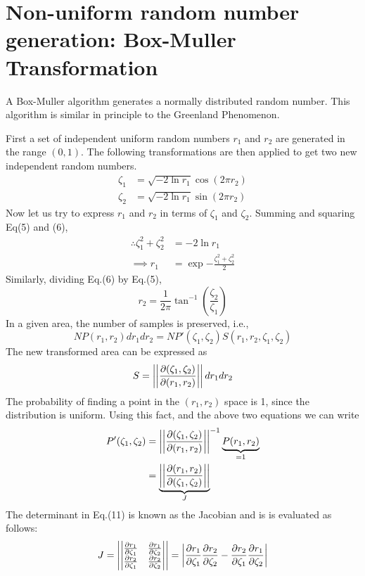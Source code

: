 \documentclass[12pt, oneside]{article}   	%
\begin{document}
\pagebreak


\pagebreak
\section{Non-uniform random number generation: Box-Muller Transformation}
A Box-Muller algorithm generates a normally distributed random number. This algorithm is similar in principle to the Greenland Phenomenon.

First a set of independent uniform random numbers $r_1$ and $r_2$ are generated in the range $(0,1)$.  The following transformations are then applied to get two new independent random numbers.
	\begin{align}
	\zeta_1 &= \sqrt{-2 \ln r_1} \cos{(2 \pi r_2)} \\
	\zeta_2 &= \sqrt{-2 \ln r_1} \sin{(2 \pi r_2)} 
	\end{align}
Now let us try to express $r_1$ and $r_2$ in terms of $\zeta_1$ and $\zeta_2$. Summing and squaring Eq(5) and (6),
	\begin{align}
	\therefore \zeta_1 ^2 + \zeta_2 ^2 &= -2 \ln{r_1} \\
	\implies r_1 &= \exp{-\frac{\zeta_1 ^2 + \zeta_2 ^2}{2}}
	\end{align}
Similarly, dividing Eq.(6) by Eq.(5),
	\begin{equation}
	r_2 = \frac{1}{2\pi} \tan^{-1}{\left( \frac{\zeta_2}{\zeta_1} \right) }
	\end{equation}
In a given area, the number of samples is preserved, i.e.,
	$$N P(r_1,r_2)dr_1 dr_2 = N  P'(\zeta_1, \zeta_2) S(r_1, r_2, \zeta_1,\zeta_2) $$
The new transformed area can be expressed as
	$$ S = \left| \left| \pdv{(\zeta_1, \zeta_2)}{(r_1, r_2)} \right| \right| dr_1 dr_2$$
The probability of finding a point in the $(r_1,r_2)$ space is 1, since the distribution is uniform. Using this fact, and the above two equations we can write
	\begin{align}
		 P'(\zeta_1, \zeta_2) &=\left| \left| \pdv{(\zeta_1, \zeta_2)}{(r_1, r_2)} \right| \right| ^{-1} \underbrace{P(r_1,r_2)}_{\text =1} \\
		 & = \underbrace{\left| \left| \pdv{(r_1, r_2)}{(\zeta_1, \zeta_2)} \right| \right|}_{J}
		 \end{align}
The determinant in Eq.(11) is known as the Jacobian and is is evaluated as follows:
	\begin{align}
		 J = \left| \begin{vmatrix}
		 \pdv{r_1}{\zeta_1} & \pdv{r_1}{\zeta_2} \\
		 \pdv{r_2}{\zeta_1} & \pdv{r_2}{\zeta_2}
		 \end{vmatrix} \right|	 = \left| \pdv{r_1}{\zeta_1} \pdv{r_2}{\zeta_2} - \pdv{r_2}{\zeta_1} \pdv{r_1}{\zeta_2} \right|
	\end{align}
\end{document}
